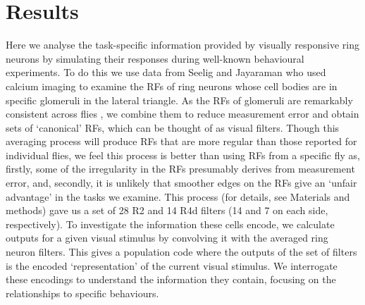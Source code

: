 \section*{Results}
Here we analyse the task-specific information provided by visually responsive ring neurons by simulating their responses during well-known behavioural experiments. To do this we use data from Seelig and Jayaraman \cite{Seelig2013} who used calcium imaging to examine the \acp{RF} of ring neurons whose cell bodies are in specific glomeruli in the lateral triangle. As the \acp{RF} of glomeruli are remarkably consistent across flies \cite{Seelig2013}, we combine them to reduce measurement error and obtain sets of ‘canonical’ \acp{RF}, which can be thought of as visual filters. Though this averaging process will produce \acp{RF} that are more regular than those reported for individual flies, we feel this process is better than using \acp{RF} from a specific fly as, firstly, some of the irregularity in the \acp{RF} presumably derives from measurement error, and, secondly, it is unlikely that smoother edges on the \acp{RF} give an ‘unfair advantage’ in the tasks we examine. This process (for details, see Materials and methods) gave us a set of 28 R2 and 14 R4d filters (14 and 7 on each side, respectively). To investigate the information these cells encode, we calculate outputs for a given visual stimulus by convolving it with the averaged ring neuron filters. This gives a population code where the outputs of the set of filters is the encoded ‘representation’ of the current visual stimulus. We interrogate these encodings to understand the information they contain, focusing on the relationships to specific behaviours.

